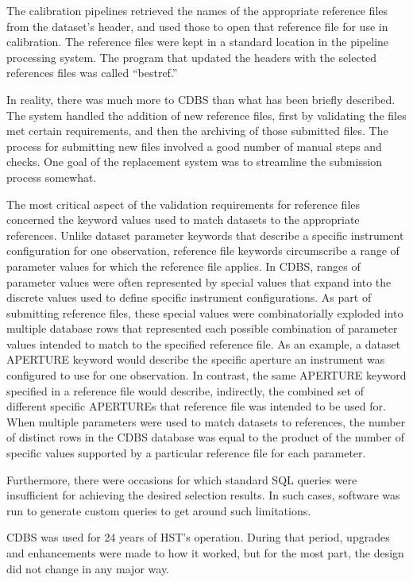 \documentclass[final,authoryear,5p,times,twocolumn]{elsarticle}
\begin{document}
The calibration pipelines retrieved the names of the appropriate reference
files from the dataset's header, and used those to open that reference file
for use in calibration. The reference files were kept in a standard location in
the pipeline processing system. The program that updated the headers with the
selected references files was called ``bestref.''

In reality, there was much more to CDBS than what has been briefly
described. The system handled the addition of new reference files, first by
validating the files met certain requirements, and then the archiving of those
submitted files. The process for submitting new files involved a good number of
manual steps and checks. One goal of the replacement system was to streamline
the submission process somewhat.

The most critical aspect of the validation requirements for reference files
concerned the keyword values used to match datasets to the appropriate
references.  Unlike dataset parameter keywords that describe a specific
instrument configuration for one observation, reference file keywords
circumscribe a range of parameter values for which the reference file applies.
In CDBS, ranges of parameter values were often represented by special values
that expand into the discrete values used to define specific instrument
configurations.  As part of submitting reference files, these special values
were combinatorially exploded into multiple database rows that represented each
possible combination of parameter values intended to match to the specified
reference file.  As an example, a dataset APERTURE keyword would describe the
specific aperture an instrument was configured to use for one observation. In
contrast, the same APERTURE keyword specified in a reference file would
describe, indirectly, the combined set of different specific APERTUREs that
reference file was intended to be used for.  When multiple parameters were used
to match datasets to references, the number of distinct rows in the CDBS
database was equal to the product of the number of specific values supported by
a particular reference file for each parameter.

Furthermore, there were occasions for which standard SQL queries were
insufficient for achieving the desired selection results. In such cases,
software was run to generate custom queries to get around such limitations.

CDBS was used for 24 years of HST's operation. During that period, upgrades and
enhancements were made to how it worked, but for the most part, the design did
not change in any major way.
\end{document}
